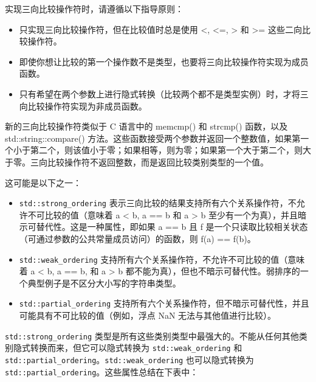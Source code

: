 实现三向比较操作符时，请遵循以下指导原则：

\begin{itemize}
\item
只实现三向比较操作符，但在比较值时总是使用 <, <=, > 和 >= 这些二向比较操作符。

\item
即使你想让比较的第一个操作数不是类型，也要将三向比较操作符实现为成员函数。

\item
只有希望在两个参数上进行隐式转换（比较两个都不是类型实例）时，才将三向比较操作符实现为非成员函数。
\end{itemize}


新的三向比较操作符类似于 C 语言中的 memcmp() 和 strcmp() 函数，以及 std::string::compare() 方法。这些函数接受两个参数并返回一个整数值，如果第一个小于第二个，则该值小于零；如果相等，则为零；如果第一个大于第二个，则大于零。三向比较操作符不返回整数，而是返回比较类别类型的一个值。

这可能是以下之一：

\begin{itemize}
\item
\verb|std::strong_ordering| 表示三向比较的结果支持所有六个关系操作符，不允许不可比较的值（意味着 a < b, a == b 和 a > b 至少有一个为真），并且暗示可替代性。这是一种属性，即如果 a == b 且 f 是一个只读取比较相关状态（可通过参数的公共常量成员访问）的函数，则 f(a) == f(b)。

\item
\verb|std::weak_ordering| 支持所有六个关系操作符，不允许不可比较的值（意味着 a < b, a == b, 和 a > b 都不能为真），但也不暗示可替代性。弱排序的一个典型例子是不区分大小写的字符串类型。

\item
\verb|std::partial_ordering| 支持所有六个关系操作符，但不暗示可替代性，并且可能具有不可比较的值（例如，浮点 NaN 无法与其他值进行比较）。
\end{itemize}

\verb|std::strong_ordering| 类型是所有这些类别类型中最强大的。不能从任何其他类别隐式转换而来，但它可以隐式转换为 \verb|std::weak_ordering| 和 \verb|std::partial_ordering|。\verb|std::weak_ordering| 也可以隐式转换为 \verb|std::partial_ordering|。这些属性总结在下表中：

